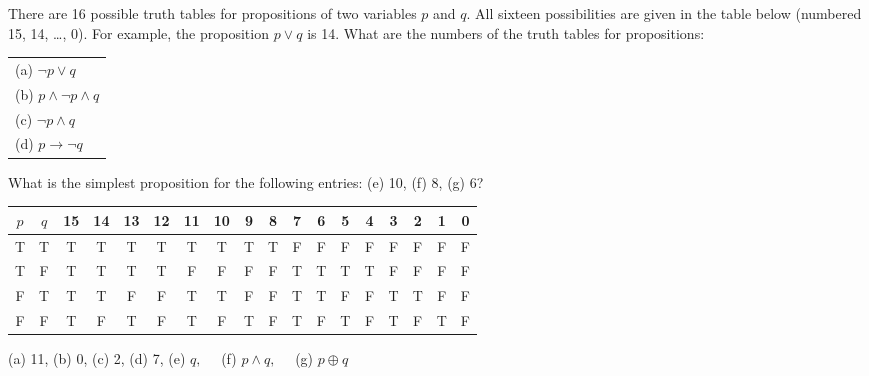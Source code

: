 \documentclass[12pt,addpoints]{exam}
\newcommand{\xor}{\oplus}
\begin{document}
\begin{questions}
\question There are 16 possible truth tables for propositions of two variables $p$ and $q$.  All sixteen possibilities are given in the table below (numbered 15, 14, \ldots, 0).  For example, the proposition $p \vee q$ is 14. What are the numbers of the truth tables for propositions:\\
 \begin{tabular}{l}
    (a) $\neg p \vee q$ \\
    (b) $p \wedge \neg p \wedge q$ \\
    (c) $\neg p \wedge q $ \\
    (d) $p \rightarrow \neg q$ \\
 \end{tabular}

 What is the simplest proposition for the following entries: (e) 10, (f) 8, (g) 6? \\
 \begin{tabular}{cc|cccc|cccc|cccc|cccc}
    $p$ & $q$ & 15 & 14 & 13 & 12 & 11 & 10 & 9 & 8 & 7 & 6 & 5 & 4 & 3 & 2 & 1 & 0 \\
    \hline
    T & T & T & T & T & T & T & T & T & T & F & F & F & F & F & F & F & F \\
    T & F & T & T & T & T & F & F & F & F & T & T & T & T & F & F & F & F \\
    F & T & T & T & F & F & T & T & F & F & T & T & F & F & T & T & F & F \\
    F & F & T & F & T & F & T & F & T & F & T & F & T & F & T & F & T & F \\
 \end{tabular}
    \begin{solution} (a) 11, \hspace{0.1in} (b) 0, \hspace{0.1in} (c) 2, \hspace{0.1in} (d) 7, \hspace{0.1in} (e) $q, \quad$ (f) $p \wedge q, \quad$ (g) $p \xor q$

\end{solution}
\end{questions}
\end{document}
